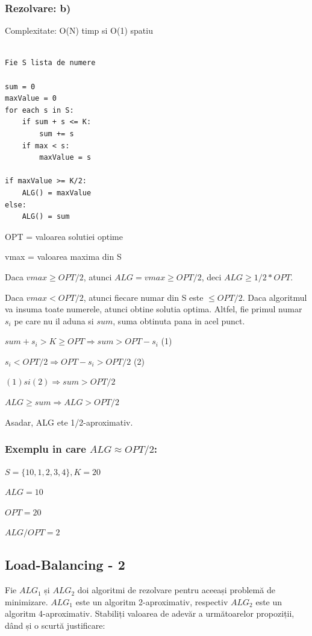 \documentclass[a4paper]{article}
\begin{document}
\subsubsection*{Rezolvare: b)}
Complexitate: O(N) timp si O(1) spatiu
\begin{lstlisting}[tabsize=2]

Fie S lista de numere

sum = 0
maxValue = 0
for each s in S:
	if sum + s <= K:
		sum += s
	if max < s:
	 	maxValue = s
	 	
if maxValue >= K/2:
	ALG() = maxValue
else:
	ALG() = sum

\end{lstlisting}

\begin{flushleft}

OPT = valoarea solutiei optime

vmax = valoarea maxima din S

Daca $vmax \geq OPT/2$, atunci $ALG = vmax \geq OPT/2$, deci $ALG \geq 1/2 * OPT$.

Daca $vmax < OPT/2$, atunci fiecare numar din S este $\leq OPT/2$.
Daca algoritmul va insuma toate numerele, atunci obtine solutia optima.
Altfel, fie primul numar $s_{i}$ pe care nu il aduna si $sum$, suma obtinuta pana in acel punct.

$sum + s_{i} > K \geq OPT \Rightarrow sum > OPT - s_{i}$ (1)

$s_{i} < OPT/2 \Rightarrow OPT - s_{i} > OPT/2$ (2)

$(1) si (2) \Rightarrow sum > OPT/2$

$ALG \geq sum \Rightarrow ALG > OPT/2$

Asadar, ALG ete 1/2-aproximativ.

\end{flushleft}

\subsubsection*{Exemplu in care $ALG \approx OPT / 2$:}
\begin{flushleft}

$S = \{10, 1, 2, 3, 4\}, K = 20$ 

$ALG = 10$

$OPT = 20$

$ALG / OPT = 2$
\end{flushleft}


\subsection{Load-Balancing - 2}
Fie $ALG_{1}$ și $ALG_{2}$ doi algoritmi de rezolvare pentru aceeași problemă de minimizare. $ALG_{1}$ este un algoritm 2-aproximativ, respectiv
$ALG_{2}$ este un algoritm 4-aproximativ. Stabiliți valoarea de adevăr a
următoarelor propoziții, dând și o scurtă justificare:
\end{document}
